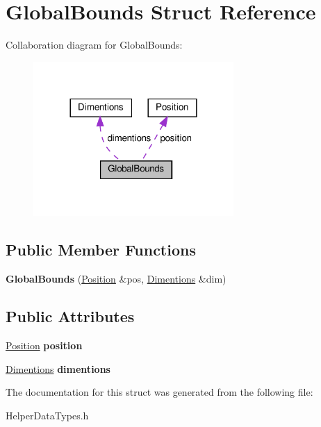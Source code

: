 \hypertarget{structGlobalBounds}{}\section{Global\+Bounds Struct Reference}
\label{structGlobalBounds}


Collaboration diagram for Global\+Bounds\+:
\nopagebreak
\begin{figure}[H]
\begin{center}
\leavevmode
\includegraphics[width=216pt]{structGlobalBounds__coll__graph}
\end{center}
\end{figure}
\subsection*{Public Member Functions}
\begin{DoxyCompactItemize}
\item 
\mbox{\label{structGlobalBounds_a38d87fc7f3c34bff62bd744ac9fc3724}} 
{\bfseries Global\+Bounds} (\hyperlink{structPosition}{Position} \&pos, \hyperlink{structDimentions}{Dimentions} \&dim)
\end{DoxyCompactItemize}
\subsection*{Public Attributes}
\begin{DoxyCompactItemize}
\item 
\mbox{\label{structGlobalBounds_a6224bede2eff12cec85b6999b7faedc3}} 
\hyperlink{structPosition}{Position} {\bfseries position}
\item 
\mbox{\label{structGlobalBounds_a1fb273eb005424a1d6ff34d3808c7081}} 
\hyperlink{structDimentions}{Dimentions} {\bfseries dimentions}
\end{DoxyCompactItemize}


The documentation for this struct was generated from the following file\+:\begin{DoxyCompactItemize}
\item 
Helper\+Data\+Types.\+h\end{DoxyCompactItemize}

